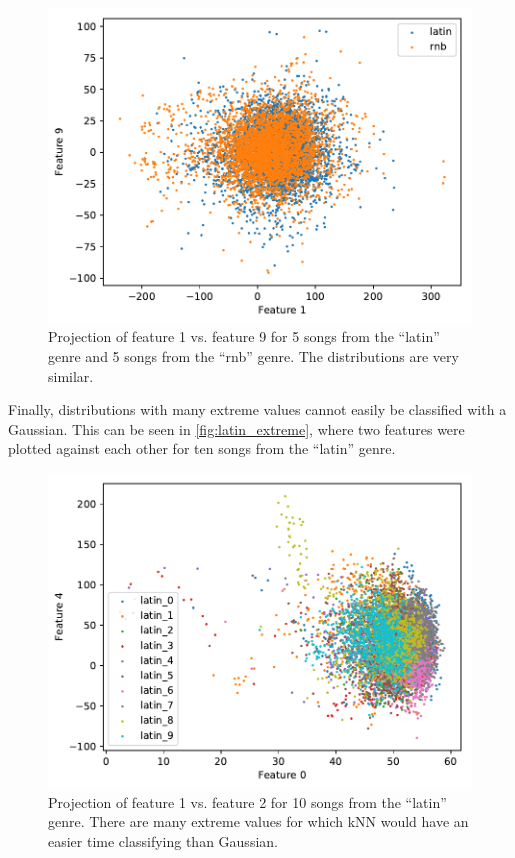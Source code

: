 \documentclass[a4paper,titlepage]{article}
\begin{document}
	\begin{figure}[!htb]
		\centering
		\includegraphics[width=\columnwidth]{plots/latin_rnb_similarity.pdf}
		\caption
		{Projection of feature 1 vs. feature 9 for 5 songs from the ``latin'' genre and 5 songs from the ``rnb'' genre. The distributions are very similar.}
		\label{fig:latin_rnb_similarity}
	\end{figure}
	
	Finally, distributions with many extreme values cannot easily be classified with a Gaussian. This can be seen in \autoref{fig:latin_extreme}, where two features were plotted against each other for ten songs from the ``latin'' genre.
	
	\begin{figure}[!htb]
		\centering
		\includegraphics[width=\columnwidth]{plots/latin_extreme.pdf}
		\caption
		{Projection of feature 1 vs. feature 2 for 10 songs from the ``latin'' genre. There are many extreme values for which kNN would have an easier time classifying than Gaussian.}
		\label{fig:latin_extreme}
	\end{figure}
	
	
	
\end{document}
